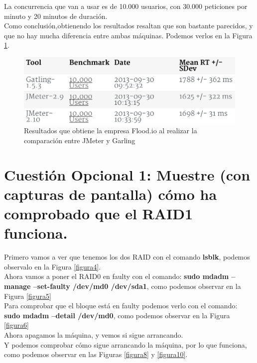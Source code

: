 La concurrencia que van a usar es de 10.000 usuarios, con 30.000 peticiones por minuto y 20 minutos de duración.\\
Como conclusión,obtienendo los resultados resaltan que son bastante parecidos, y que no hay mucha diferencia entre ambas máquinas. Podemos verlos en la Figura \ref{figura28}.

\begin{figure}[H] %
	\centering
	\includegraphics[scale=0.5]{figuras/figura28.png}  %
	
	
	\caption{Resultados que obtiene la empresa Flood.io \cite{articulo} al realizar la comparación entre JMeter y Garling}
	\label{figura28}
\end{figure}




\section{Cuestión Opcional 1: Muestre (con capturas de pantalla) cómo ha comprobado que el RAID1 funciona.}

Primero vamos a ver que tenemos los dos RAID con el comando \textbf{lsblk}, podemos observalo en la Figura \ref{figura4}.\\
Ahora vamos a poner el RAID0 en faulty con el comando: \textbf{sudo mdadm --manage --set-faulty /dev/md0 /dev/sda1}, como podemos observar en la Figura \ref{figura5}\\
Para comprobar que el bloque está en faulty podemos verlo con el comando: \textbf{sudo mdadm --detail /dev/md0}, como podemos observar en la Figura \ref{figura6}\\
Ahora apagamos la máquina, y vemos si sigue arrancando.\\
Y podemos comprobar cómo sigue arrancando la máquina, por lo que funciona, como podemos observar en las Figuras \ref{figura8} y \ref{figura10}.

